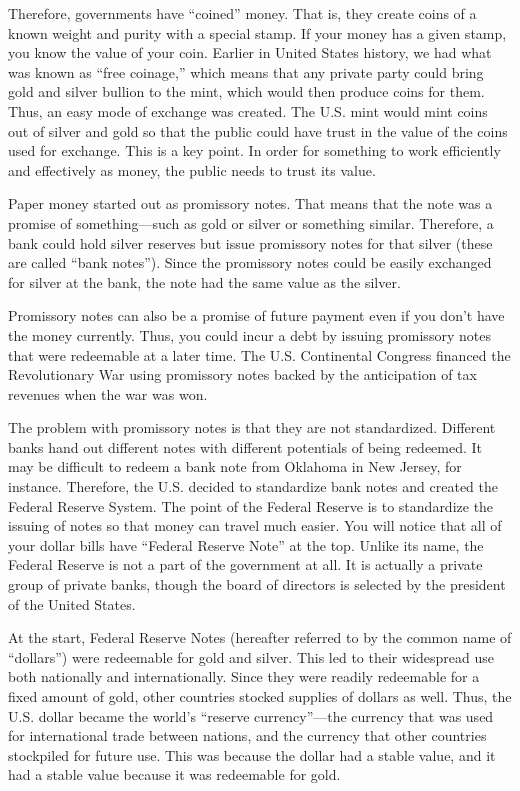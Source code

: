 \documentclass[letterpaper]{article}
\begin{document}
{\color{black}
Therefore, governments have “coined” money. That is, they create coins
of a known weight and purity with a special stamp. If your money has a
given stamp, you know the value of your coin. Earlier in United States
history, we had what was known as “free coinage,” which means that any
private party could bring gold and silver bullion to the mint, which
would then produce coins for them. Thus, an easy mode of exchange was
created. The U.S. mint would mint coins out of silver and gold so that
the public could have trust in the value of the coins used for
exchange. This is a key point. In order for something to work
efficiently and effectively as money, the public needs to trust its
value.}

{\color{black}
Paper money started out as promissory notes. That means that the note
was a promise of something—such as gold or silver or something similar.
Therefore, a bank could hold silver reserves but issue promissory notes
for that silver (these are called “bank notes”). Since the promissory
notes could be easily exchanged for silver at the bank, the note had
the same value as the silver. }

{\color{black}
Promissory notes can also be a promise of future payment even if you
don’t have the money
\textcolor[rgb]{0.32941177,0.5529412,0.83137256}{currently}. Thus, you
could incur a debt by issuing promissory notes that were redeemable at
a later time. The U.S. Continental Congress financed the Revolutionary
War using promissory notes backed by the anticipation of tax revenues
when the war was won.}

{\color{black}
The problem with promissory notes is that they are not standardized.
Different banks hand out different notes with different potentials of
being redeemed. It may be difficult to redeem a bank note from Oklahoma
in New Jersey, for instance. Therefore, the U.S. decided to standardize
bank notes and created the Federal Reserve System. The point of the
Federal Reserve is to standardize the issuing of notes so that money
can travel much easier. You will notice that all of your dollar bills
have “Federal Reserve Note” at the top.  Unlike its name, the Federal
Reserve is not a part of the government at all.  It is actually a
private group of private banks, though the board of directors is
selected by the president of the United States.}

{\color{black}
At the start, Federal Reserve Notes (hereafter referred to by the common
name of “dollars”) were redeemable for gold and silver. This led to
their widespread use both nationally and internationally. Since they
were readily redeemable for a fixed amount of gold, other countries
stocked supplies of dollars as well. Thus, the U.S. dollar became the
world’s “reserve currency”—the currency that was used for international
trade between nations, and the currency that other countries stockpiled
for future use. This was because the dollar had a stable value, and it
had a stable value because it was redeemable for gold.}
\end{document}
